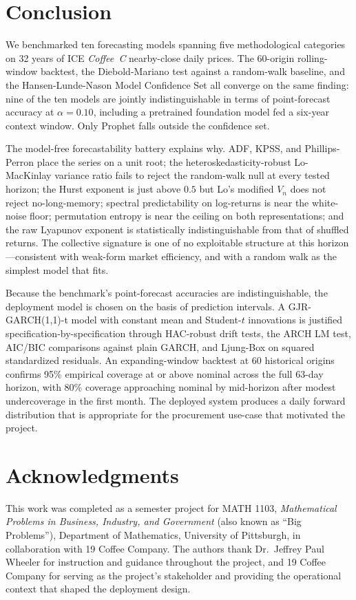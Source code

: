 \documentclass[conference]{IEEEtran}
\begin{document}
\section{Conclusion}
\label{sec:conclusion}

We benchmarked ten forecasting models spanning five methodological
categories on 32 years of ICE \emph{Coffee~C} nearby-close daily
prices. The 60-origin rolling-window backtest, the Diebold-Mariano
test against a random-walk baseline, and the Hansen-Lunde-Nason
Model Confidence Set all converge on the same finding: nine of the
ten models are jointly indistinguishable in terms of point-forecast
accuracy at $\alpha = 0.10$, including a pretrained foundation model
fed a six-year context window. Only Prophet falls outside the
confidence set.

The model-free forecastability battery explains why. ADF, KPSS, and
Phillips-Perron place the series on a unit root; the
heteroskedasticity-robust Lo-MacKinlay variance ratio fails to
reject the random-walk null at every tested horizon; the Hurst
exponent is just above $0.5$ but Lo's modified $V_n$ does not
reject no-long-memory; spectral predictability on log-returns is
near the white-noise floor; permutation entropy is near the ceiling
on both representations; and the raw Lyapunov exponent is
statistically indistinguishable from that of shuffled returns. The
collective signature is one of no exploitable structure at this
horizon---consistent with weak-form market efficiency, and with a
random walk as the simplest model that fits.

Because the benchmark's point-forecast accuracies are
indistinguishable, the deployment model is chosen on the basis of
prediction intervals. A GJR-GARCH(1{,}1)-t model with constant mean
and Student-$t$ innovations is justified specification-by-specification
through HAC-robust drift tests, the ARCH LM test, AIC/BIC comparisons
against plain GARCH, and Ljung-Box on squared standardized residuals.
An expanding-window backtest at 60 historical origins confirms 95\%
empirical coverage at or above nominal across the full 63-day
horizon, with 80\% coverage approaching nominal by mid-horizon after
modest undercoverage in the first month. The deployed system produces a daily
forward distribution that is appropriate for the procurement use-case
that motivated the project.

\section*{Acknowledgments}

This work was completed as a semester project for MATH 1103,
\emph{Mathematical Problems in Business, Industry, and Government}
(also known as ``Big Problems''), Department of Mathematics,
University of Pittsburgh, in collaboration with 19 Coffee Company.
The authors thank Dr.~Jeffrey Paul Wheeler for instruction and
guidance throughout the project, and 19 Coffee Company for serving
as the project's stakeholder and providing the operational context
that shaped the deployment design.



\end{document}
